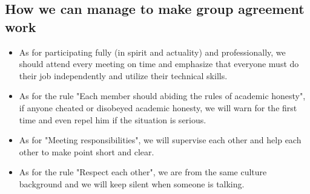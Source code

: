 \subsection{How we can manage to make group agreement work}
\begin{itemize}
    \item As for participating fully (in spirit and actuality) and professionally, we should attend every meeting on time and emphasize that everyone must do their job independently and utilize their technical skills.
    \item As for the rule "Each member should abiding the rules of academic honesty", if anyone cheated or disobeyed academic honesty, we will warn for the first time and even repel him if the situation is serious.
    \item As for "Meeting responsibilities", we will supervise each other and help each other to make point short and clear.
    \item As for the rule "Respect each other", we are from the same culture background and we will keep silent when someone is talking.


\end{itemize}